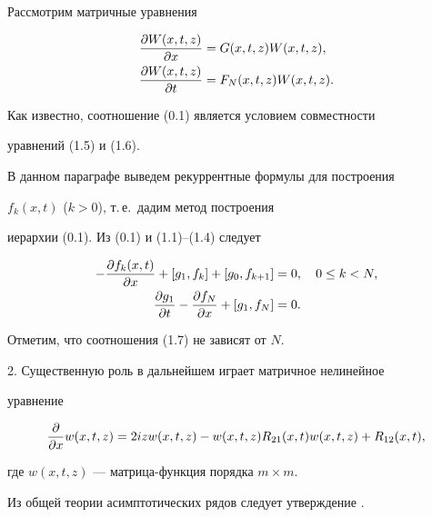  


Рассмотрим матричные уравнения 


\begin{align} 


\myfrac{W(x,t,z)}{x}&=G(x,t,z)W(x,t,z),\\ 


\myfrac{W(x,t,z)}{t}&=F_N(x,t,z)W(x,t,z). 


\end{align} 


Как известно, соотношение (0.1) является условием совместности 


уравнений (1.5) и (1.6). 


 


В данном параграфе выведем рекуррентные формулы для построения 


$f_k(x,t)$ ($k>0$), т.\,е.~дадим метод построения 


иерархии (0.1). Из (0.1) и (1.1)--(1.4) следует 


\begin{align} 


-\myfrac{f_k(x,t)}{x}+[g_1,f_k]+[g_0,f_{k+1}]&=0,\quad 


0\le k<N,\\ 


\myfrac{g_1}{t}-\myfrac{f_N}{x}+[g_1,f_N]&=0. 


\end{align} 


Отметим, что соотношения (1.7) не зависят от $N$. 


 


2. Существенную роль в дальнейшем играет матричное нелинейное  


уравнение 


\begin{equation} 


\myfrac{}{x}w(x,t,z)=2i z w(x,t,z)-w(x,t,z) 


R_{21}(x,t)w(x,t,z)+R_{12}(x,t), 


\end{equation} 


где $w(x,t,z)$ --- матрица-функция порядка $m\times m$. 


 


Из общей теории асимптотических рядов следует утверждение \cite{5}. 


 



